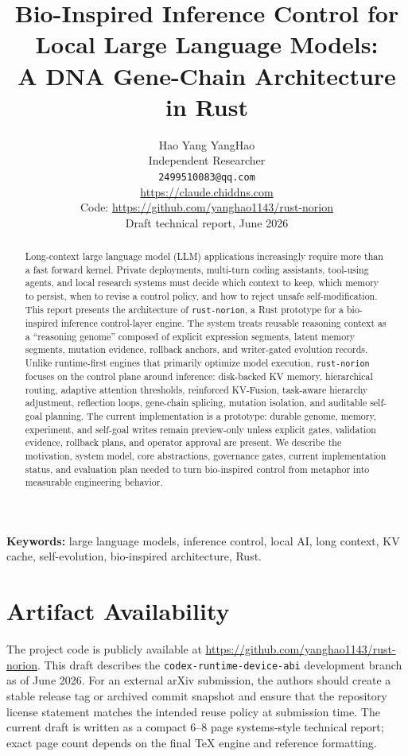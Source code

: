 \documentclass[10pt]{article}
\title{Bio-Inspired Inference Control for Local Large Language Models:\\
A DNA Gene-Chain Architecture in Rust}
\author{
  Hao Yang YangHao\\
  Independent Researcher\\
  \texttt{2499510083@qq.com}\\
  \url{https://claude.chiddns.com}\\
  Code: \url{https://github.com/yanghao1143/rust-norion}\\
  Draft technical report, June 2026
}
\date{}
\begin{document}
\maketitle

\begin{abstract}
Long-context large language model (LLM) applications increasingly require more
than a fast forward kernel. Private deployments, multi-turn coding assistants,
tool-using agents, and local research systems must decide which context to keep,
which memory to persist, when to revise a control policy, and how to reject
unsafe self-modification. This report presents the architecture of
\texttt{rust-norion}, a Rust prototype for a bio-inspired inference
control-layer engine. The system treats reusable reasoning context as a
``reasoning genome'' composed of explicit expression segments, latent memory
segments, mutation evidence, rollback anchors, and writer-gated evolution
records. Unlike runtime-first engines that primarily optimize model execution,
\texttt{rust-norion} focuses on the control plane around inference:
disk-backed KV memory, hierarchical routing, adaptive attention thresholds,
reinforced KV-Fusion, task-aware hierarchy adjustment, reflection loops,
gene-chain splicing, mutation isolation, and auditable self-goal planning. The
current implementation is a prototype: durable genome, memory, experiment, and
self-goal writes remain preview-only unless explicit gates, validation evidence,
rollback plans, and operator approval are present. We describe the motivation,
system model, core abstractions, governance gates, current implementation
status, and evaluation plan needed to turn bio-inspired control from metaphor
into measurable engineering behavior.
\end{abstract}

\noindent\textbf{Keywords:} large language models, inference control, local AI,
long context, KV cache, self-evolution, bio-inspired architecture, Rust.

\section*{Artifact Availability}

The project code is publicly available at
\url{https://github.com/yanghao1143/rust-norion}. This draft describes the
\texttt{codex-runtime-device-abi} development branch as of June 2026. For an
external arXiv submission, the authors should create a stable release tag or
archived commit snapshot and ensure that the repository license statement
matches the intended reuse policy at submission time. The current draft is
written as a compact 6--8 page systems-style technical report; exact page count
depends on the final TeX engine and reference formatting.
\end{document}
